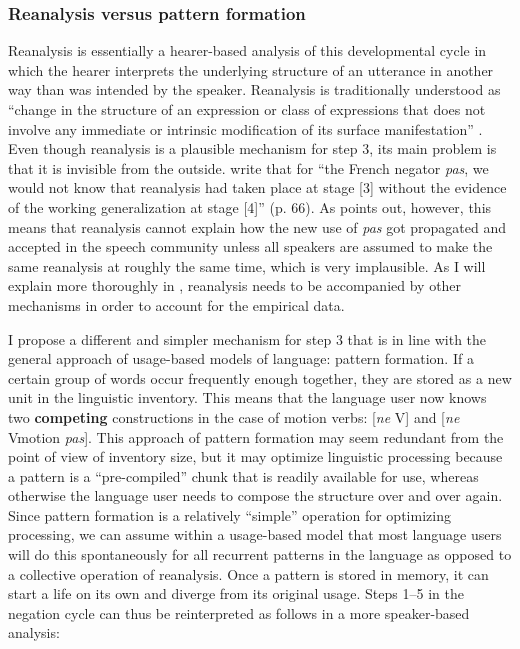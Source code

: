 \subsubsection{Reanalysis versus pattern formation}
 Reanalysis is essentially a hearer-based analysis of this developmental cycle in which the hearer interprets the underlying structure of an utterance in another way than was intended by the speaker. Reanalysis is traditionally understood as  ``change in the structure of an expression or class of expressions that does not involve any immediate or intrinsic modification of its surface manifestation''  \citep[58]{langacker77syntactic}. 
Even though reanalysis is a plausible mechanism for step 3, its main problem is that it is invisible from the outside. \citet{hopper93grammaticalization} write that for  ``the French negator {\em pas}, we would not know that reanalysis had taken place at stage [3] without the evidence of the working generalization at stage [4]''  (p. 66). As \citet{haspelmath98does} points out, however, this means that reanalysis cannot explain how the new use of {\em pas} got propagated and accepted in the speech community unless all speakers are assumed to make the same reanalysis at roughly the same time, which is very implausible. As I will explain more thoroughly in , reanalysis needs to be accompanied by other mechanisms in order to account for the empirical data.

I propose a different and simpler mechanism for step 3 that is in line with the general approach of usage-based models of language: pattern formation. If a certain group of words occur frequently enough together, they are stored as a new unit in the linguistic inventory. This means that the language user now knows two {\bfseries competing} constructions in the case of motion verbs: [{\em ne} V] and [{\em ne} Vmotion {\em pas}]. This approach of pattern formation may seem redundant from the point of view of inventory size, but it may optimize linguistic processing because a pattern is a ``pre-compiled'' chunk that is readily available for use, whereas otherwise the language user needs to compose the structure over and over again. Since pattern formation is a relatively ``simple'' operation for optimizing processing, we can assume within a usage-based model that most language users will do this spontaneously for all recurrent patterns in the language as opposed to a collective operation of reanalysis. Once a pattern is stored in memory, it can start a life on its own and diverge from its original usage. Steps 1--5 in the negation cycle can thus be reinterpreted as follows in a more speaker-based analysis:


